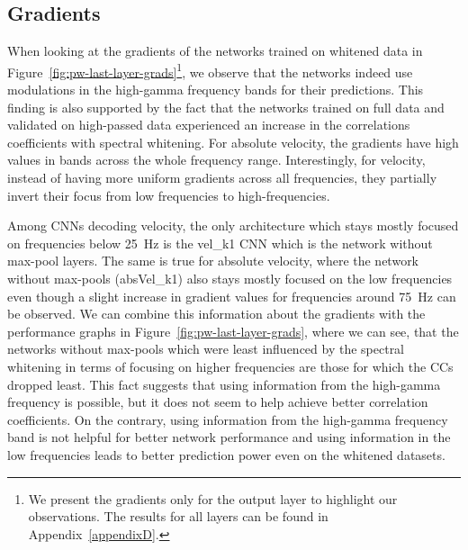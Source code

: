 \subsection{Gradients}\label{subsec:pw-gradients2}
When looking at the gradients of the networks trained on whitened data in Figure~\ref{fig:pw-last-layer-grads}\footnote{We present the gradients only for the output layer to highlight our observations. 
The results for all layers can be found in Appendix~\ref{appendixD}.}, we observe that the networks indeed use modulations in the high-gamma frequency bands for their predictions. 
This finding is also supported by the fact that the networks trained on full data and validated on high-passed data experienced an increase in the correlations coefficients with spectral whitening.
For absolute velocity, the gradients have high values in bands across the whole frequency range. Interestingly, for velocity, instead of having more uniform gradients across all frequencies, they partially invert their focus from low frequencies to high-frequencies.

Among CNNs decoding velocity, the only architecture which stays mostly focused on frequencies below 25~Hz is the vel\_k1 CNN which is the network without max-pool layers.
The same is true for absolute velocity, where the network without max-pools (absVel\_k1) also stays mostly focused on the low frequencies even though a slight increase in gradient values for frequencies around 75~Hz can be observed. 
We can combine this information about the gradients with the performance graphs in Figure~\ref{fig:pw-last-layer-grads}, where we can see, that the networks without max-pools which were least influenced by the spectral whitening in terms of focusing on higher frequencies are those for which the CCs dropped least.
This fact suggests that using information from the high-gamma frequency is possible, but it does not seem to help achieve better correlation coefficients. 
On the contrary, using information from the high-gamma frequency band is not helpful for better network performance and using information in the low frequencies leads to better prediction power even on the whitened datasets.

